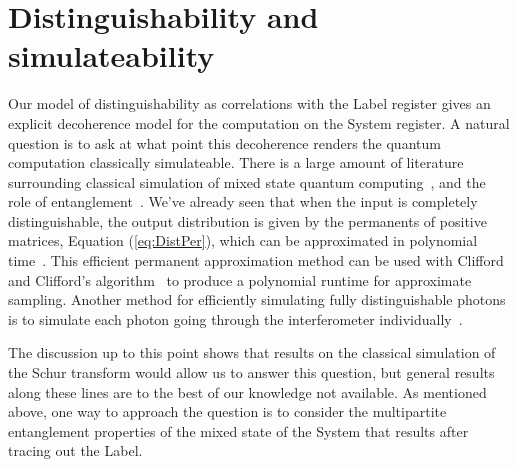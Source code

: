 \section{Distinguishability and simulateability}
\label{sec:mixture}

Our model of distinguishability as correlations with the Label register gives an explicit decoherence model for the computation on the System register.
A natural question is to ask at what point this decoherence renders the quantum computation classically simulateable.
There is a large amount of literature surrounding classical simulation of mixed state quantum computing~\cite{fujii2014, morimae2014classical, morimae2014hardness}, and the role of entanglement~\cite{harrow2003, virmani2005, buhrman2006, vidal2003, animesh2007}. 
We've already seen that when the input is completely distinguishable, the output distribution is given by the permanents of positive matrices, Equation (\ref{eq:DistPer}), which can be approximated in polynomial time~\cite{anari2017}. 
This efficient permanent approximation method can be used with Clifford and Clifford's algorithm~\cite{clifford2017} to produce a polynomial runtime for approximate sampling. 
Another method for efficiently simulating fully distinguishable photons is to simulate each photon going through the interferometer individually~\cite{aaronson2014,neville2017}. 

The discussion up to this point shows that results on the classical simulation of the Schur transform would allow us to answer this question, but general results along these lines are to the best of our knowledge not available.
As mentioned above, one way to approach the question is to consider the multipartite entanglement properties of the mixed state of the System that results after tracing out the Label.

